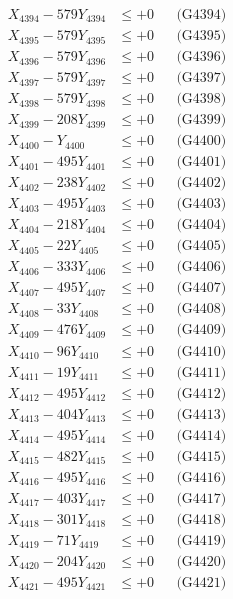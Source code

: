 \documentclass[a4paper,10pt]{article}
\begin{document}
{\begin{align}
X_{4394} - 579Y_{4394} &\leq +0 && \text{(G4394)} \\
X_{4395} - 579Y_{4395} &\leq +0 && \text{(G4395)} \\
X_{4396} - 579Y_{4396} &\leq +0 && \text{(G4396)} \\
X_{4397} - 579Y_{4397} &\leq +0 && \text{(G4397)} \\
X_{4398} - 579Y_{4398} &\leq +0 && \text{(G4398)} \\
X_{4399} - 208Y_{4399} &\leq +0 && \text{(G4399)} \\
X_{4400} - Y_{4400} &\leq +0 && \text{(G4400)} \\
\allowbreak
X_{4401} - 495Y_{4401} &\leq +0 && \text{(G4401)} \\
X_{4402} - 238Y_{4402} &\leq +0 && \text{(G4402)} \\
X_{4403} - 495Y_{4403} &\leq +0 && \text{(G4403)} \\
X_{4404} - 218Y_{4404} &\leq +0 && \text{(G4404)} \\
X_{4405} - 22Y_{4405} &\leq +0 && \text{(G4405)} \\
X_{4406} - 333Y_{4406} &\leq +0 && \text{(G4406)} \\
X_{4407} - 495Y_{4407} &\leq +0 && \text{(G4407)} \\
X_{4408} - 33Y_{4408} &\leq +0 && \text{(G4408)} \\
X_{4409} - 476Y_{4409} &\leq +0 && \text{(G4409)} \\
X_{4410} - 96Y_{4410} &\leq +0 && \text{(G4410)} \\
\allowbreak
X_{4411} - 19Y_{4411} &\leq +0 && \text{(G4411)} \\
X_{4412} - 495Y_{4412} &\leq +0 && \text{(G4412)} \\
X_{4413} - 404Y_{4413} &\leq +0 && \text{(G4413)} \\
X_{4414} - 495Y_{4414} &\leq +0 && \text{(G4414)} \\
X_{4415} - 482Y_{4415} &\leq +0 && \text{(G4415)} \\
X_{4416} - 495Y_{4416} &\leq +0 && \text{(G4416)} \\
X_{4417} - 403Y_{4417} &\leq +0 && \text{(G4417)} \\
X_{4418} - 301Y_{4418} &\leq +0 && \text{(G4418)} \\
X_{4419} - 71Y_{4419} &\leq +0 && \text{(G4419)} \\
X_{4420} - 204Y_{4420} &\leq +0 && \text{(G4420)} \\
\allowbreak
X_{4421} - 495Y_{4421} &\leq +0 && \text{(G4421)} \\

\end{align}}
\end{document}
